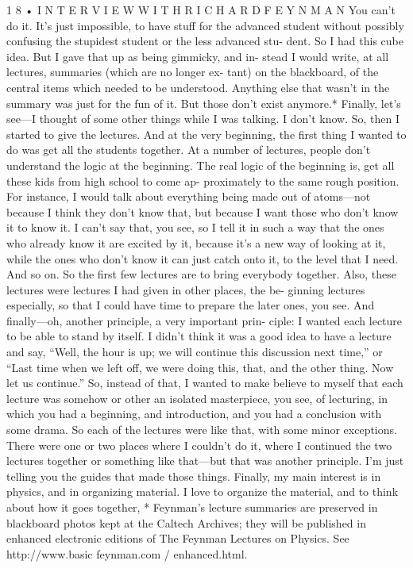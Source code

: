 \documentclass[10pt,oneside]{article}
\begin{document}
1 8 • I N T E R V I E W  W I T H  R I C H A R D  F E Y N M A N You can’t do it. It’s just impossible, to have stuff for the advanced student without possibly confusing the stupidest student or the less advanced stu- dent. So I had this cube idea. But I gave that up as being gimmicky, and in- stead I would write, at all lectures, summaries (which are no longer ex- tant) on the blackboard, of the central items which needed to be understood. Anything else that wasn’t in the summary was just for the fun of it. But those don’t exist anymore.* Finally, let’s see---I thought of some other things while I was talking. I don’t know. So, then I started to give the lectures. And at the very beginning, the first thing I wanted to do was get all the students together. At a number of lectures, people don’t understand the logic at the beginning. The real logic of the beginning is, get all these kids from high school to come ap- proximately to the same rough position. For instance, I would talk about everything being made out of atoms---not because I think they don’t know that, but because I want those who don’t know it to know it. I can’t say that, you see, so I tell it in such a way that the ones who already know it are excited by it, because it’s a new way of looking at it, while the ones who don’t know it can just catch onto it, to the level that I need. And so on. So the first few lectures are to bring everybody together. Also, these lectures were lectures I had given in other places, the be- ginning lectures especially, so that I could have time to prepare the later ones, you see. And finally---oh, another principle, a very important prin- ciple: I wanted each lecture to be able to stand by itself. I didn’t think it was a good idea to have a lecture and say, “Well, the hour is up; we will continue this discussion next time,” or “Last time when we left off, we were doing this, that, and the other thing. Now let us continue.” So, instead of that, I wanted to make believe to myself that each lecture was somehow or other an isolated masterpiece, you see, of lecturing, in which you had a beginning, and introduction, and you had a conclusion with some drama. So each of the lectures were like that, with some minor exceptions. There were one or two places where I couldn’t do it, where I continued the two lectures together or something like that---but that was another principle. I’m just telling you the guides that made those things. Finally, my main interest is in physics, and in organizing material. I love to organize the material, and to think about how it goes together, * Feynman’s lecture summaries are preserved in blackboard photos kept at the Caltech Archives; they will be published in enhanced electronic editions of The Feynman Lectures on Physics. See http://www.basic feynman.com / enhanced.html.\par
\end{document}
